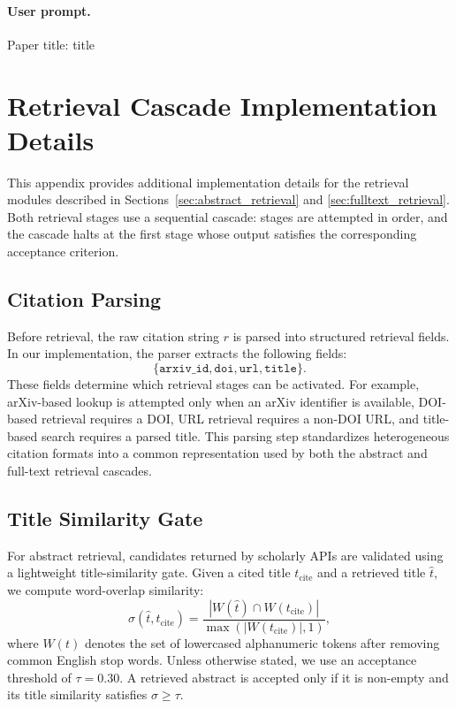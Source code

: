 \documentclass{article}
\theoremstyle{plain}
\theoremstyle{definition}
\theoremstyle{remark}
\begin{document}
\paragraph{User prompt.}
\begin{promptbox}
Paper title: {title}
\end{promptbox}

\section{Retrieval Cascade Implementation Details}
\label{app:retrieval_details}

This appendix provides additional implementation details for the retrieval modules described in Sections~\ref{sec:abstract_retrieval} and \ref{sec:fulltext_retrieval}. Both retrieval stages use a sequential cascade: stages are attempted in order, and the cascade halts at the first stage whose output satisfies the corresponding acceptance criterion.


\subsection{Citation Parsing}
\label{app:citation_parsing}

Before retrieval, the raw citation string $r$ is parsed into structured retrieval fields. In our implementation, the parser extracts the following fields:
\[
\{\texttt{arxiv\_id}, \texttt{doi}, \texttt{url}, \texttt{title}\}.
\]
These fields determine which retrieval stages can be activated. For example, arXiv-based lookup is attempted only when an arXiv identifier is available, DOI-based retrieval requires a DOI, URL retrieval requires a non-DOI URL, and title-based search requires a parsed title. This parsing step standardizes heterogeneous citation formats into a common representation used by both the abstract and full-text retrieval cascades.

\subsection{Title Similarity Gate}
\label{app:title_similarity}

For abstract retrieval, candidates returned by scholarly APIs are validated using a lightweight title-similarity gate. Given a cited title $t_{\mathrm{cite}}$ and a retrieved title $\hat{t}$, we compute word-overlap similarity:
\begin{equation}
\sigma(\hat{t}, t_{\mathrm{cite}}) =
\frac{|W(\hat{t}) \cap W(t_{\mathrm{cite}})|}
{\max(|W(t_{\mathrm{cite}})|, 1)},
\end{equation}
where $W(t)$ denotes the set of lowercased alphanumeric tokens after removing common English stop words. Unless otherwise stated, we use an acceptance threshold of $\tau = 0.30$. A retrieved abstract is accepted only if it is non-empty and its title similarity satisfies $\sigma \geq \tau$.
\end{document}
